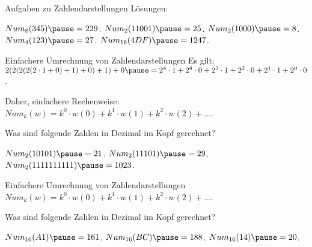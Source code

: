 \begin{frame}{Aufgaben zu Zahlendarstellungen}
	\pause Lösungen:
	\begin{itemize}
		\pitem $Num_8(345) \p = 229$.
		\pitem $Num_2(11001) \p = 25$.
		\pitem $Num_2(1000) \p = 8$.
		\pitem $Num_4(123) \p = 27$.
		\pitem $Num_{16}(4DF) \p = 1247$. 
	\end{itemize}
\end{frame}

\begin{frame}{Einfachere Umrechnung von Zahlendarstellungen}
	Es gilt: $2(2(2(2(2 \cdot 1 + 0)+1)+0)+1)+0 \p = 2^4 \cdot 1 + 2^4 \cdot 0 + 2^3 \cdot 1 + 2^2 \cdot 0 + 2^1 \cdot 1 + 2^0 \cdot 0$.
	
	\p Daher, einfachere Rechenweise: $Num_k(w) = k^0 \cdot w(0) + k^1 \cdot w(1) + k^2 \cdot w(2) + ...$.
	
	\p Was sind folgende Zahlen in Dezimal im Kopf gerechnet?
	
	\begin{itemize}
		\pitem $Num_2(10101) \p = 21$.
		\pitem $Num_2(11101) \p = 29$.
		\pitem $Num_2(1111111111) \p = 1023$.
	\end{itemize}
	
\end{frame}
		
\begin{frame}{Einfachere Umrechnung von Zahlendarstellungen}
	$Num_k(w) = k^0 \cdot w(0) + k^1 \cdot w(1) + k^2 \cdot w(2) + ...$.
	
	\p Was sind folgende Zahlen in Dezimal im Kopf gerechnet?
	
	\begin{itemize}
		\pitem $Num_{16}(A1) \p = 161$.
		\pitem $Num_{16}(BC) \p = 188$.
		\pitem $Num_{16}(14) \p = 20$.
	\end{itemize}
	
\end{frame}

